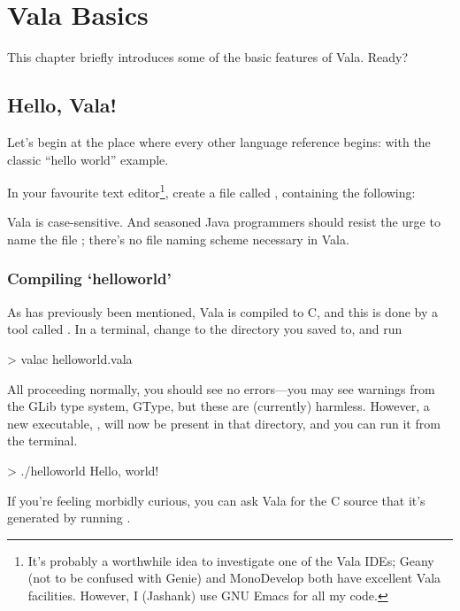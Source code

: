 \chapter{Vala Basics}

This chapter briefly introduces some of the basic features of Vala.  Ready?

\section{Hello, Vala!}

Let's begin at the place where every other language reference begins: with the
classic ``hello world'' example.

In your favourite text editor\footnote{It's probably a worthwhile idea to
  investigate one of the Vala IDEs; Geany (not to be confused with Genie) and
  MonoDevelop both have excellent Vala facilities.  However, I (Jashank) use
  GNU Emacs for all my code.}, create a file called ,
containing the following:


Vala is case-sensitive.  And seasoned Java programmers should resist the urge
to name the file ; there's no file naming scheme
necessary in Vala.

\subsection{Compiling `helloworld'}

As has previously been mentioned, Vala is compiled to C, and this is done by a
tool called .  In a terminal, change to the directory you saved
 to, and run

\begin{bashcommands}
> valac helloworld.vala
\end{bashcommands}

All proceeding normally, you should see no errors---you may see warnings from
the GLib type system, GType, but these are (currently) harmless.  However, a
new executable, , will now be present in that directory, and
you can run it from the terminal.

\begin{bashcommands}
> ./helloworld
Hello, world!
\end{bashcommands}

If you're feeling morbidly curious, you can ask Vala for the C source that
it's generated by running .


